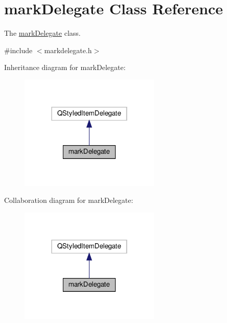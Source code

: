 \hypertarget{classmark_delegate}{}\section{mark\+Delegate Class Reference}
\label{classmark_delegate}


The \mbox{\hyperlink{classmark_delegate}{mark\+Delegate}} class.  




{\ttfamily \#include $<$markdelegate.\+h$>$}



Inheritance diagram for mark\+Delegate\+:\nopagebreak
\begin{figure}[H]
\begin{center}
\leavevmode
\includegraphics[width=190pt]{classmark_delegate__inherit__graph}
\end{center}
\end{figure}


Collaboration diagram for mark\+Delegate\+:\nopagebreak
\begin{figure}[H]
\begin{center}
\leavevmode
\includegraphics[width=190pt]{classmark_delegate__coll__graph}
\end{center}
\end{figure}
